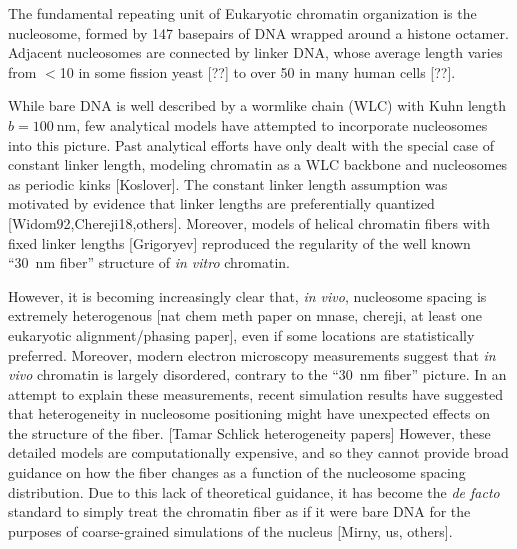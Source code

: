 \documentclass[%
 reprint,
superscriptaddress,
showpacs,preprintnumbers,
 amsmath,amssymb,
 aps,
 prl,
]{revtex4-1}
\begin{document}
The fundamental repeating unit of Eukaryotic chromatin organization is the
    nucleosome, formed by 147 basepairs of DNA wrapped around a histone octamer.
Adjacent nucleosomes are connected by linker DNA, whose average length varies from
    $<$\SI{10}{\basepair} in some fission yeast [??] to over \SI{50}{\basepair} in
    many human cells [??].

While bare DNA is well described by a wormlike chain (WLC) with Kuhn length
    {$b = \SI{100}{\nano\metre}$}, few analytical models have attempted to
    incorporate nucleosomes into this picture.
Past analytical efforts have only dealt with the special
    case of constant linker length, modeling chromatin as a WLC backbone and
    nucleosomes as periodic kinks [Koslover].
The constant linker length assumption was motivated by evidence
    that linker lengths are preferentially quantized [Widom92,Chereji18,others].
Moreover, models of helical chromatin fibers with fixed linker lengths
    [Grigoryev] reproduced the regularity of the well known ``\SI{30}{\nano\metre}
    fiber'' structure of \textit{in vitro} chromatin.

However, it is becoming increasingly clear that, \textit{in vivo}, nucleosome
    spacing is extremely heterogenous [nat chem meth paper on mnase, chereji, at
    least one eukaryotic alignment/phasing paper], even if some locations are
    statistically preferred.
Moreover, modern electron microscopy measurements suggest that \textit{in vivo} chromatin
    is largely disordered, contrary to the ``\SI{30}{\nano\metre} fiber''
    picture.
In an attempt to explain these measurements, recent simulation results have
    suggested that heterogeneity in nucleosome positioning might have unexpected
    effects on the structure of the fiber. [Tamar Schlick heterogeneity papers]
However, these detailed models are computationally expensive, and so they cannot
    provide broad guidance on how the fiber changes as a function of the nucleosome
    spacing distribution.
Due to this lack of theoretical guidance, it has become the \textit{de facto}
    standard to simply treat the chromatin fiber as if it were bare DNA for
    the purposes of coarse-grained simulations of the nucleus [Mirny, us,
    others].
\end{document}
